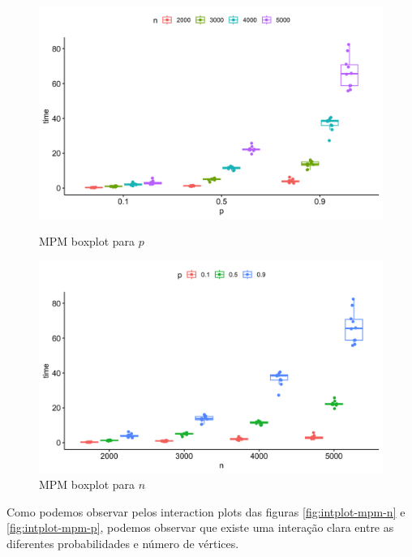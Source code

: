 \documentclass{uofa-eng-assignment}
\begin{document}
\begin{figure}[h]
    \begin{minipage}{0.45\textwidth}
        \centering
        \includegraphics[width=.7\linewidth]{mpm_plot2.png}
        \caption{MPM boxplot para $p$}
        \label{fig:boxplot-mpm-p}
    \end{minipage}
    \hfill
    \begin{minipage}{0.45\textwidth}
        \centering
        \includegraphics[width=.7\linewidth]{mpm_plot1.png}
        \caption{MPM boxplot para $n$}
        \label{fig:boxplot-mpm-n}
    \end{minipage}
\end{figure}

Como podemos observar pelos interaction plots das figuras \ref{fig:intplot-mpm-n} e \ref{fig:intplot-mpm-p}, podemos observar que existe uma interação clara entre as diferentes probabilidades e número de vértices.
\end{document}
